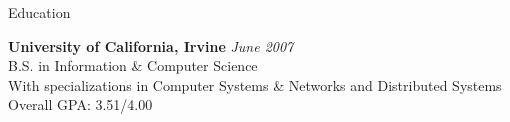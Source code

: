 \documentclass{resume} %
\begin{document}

\begin{rSection}{Education}

{\bf University of California, Irvine} \hfill {\em June 2007} \\ 
B.S. in Information \& Computer Science \\
With specializations in Computer Systems \& Networks and Distributed Systems \\
Overall GPA: 3.51/4.00

\end{rSection}
\end{document}
